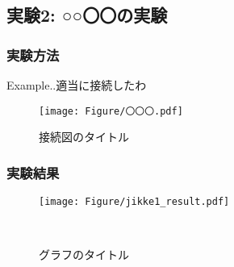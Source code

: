 \clearpage
\subsection{実験2: ○○〇〇の実験}
  \subsubsection{実験方法}
  Example..適当に接続したわ

    \begin{figure}[htbp]
    \centering
    \texttt{[image: Figure/〇〇〇.pdf]}
    \caption{接続図のタイトル}
    \end{figure}

  

  \clearpage
  \subsubsection{実験結果}
  

  
  \begin{figure}[htbp]
    \centering
    \texttt{[image: Figure/jikke1\_result.pdf]}
    \caption{グラフのタイトル}
　\end{figure}


\clearpage




